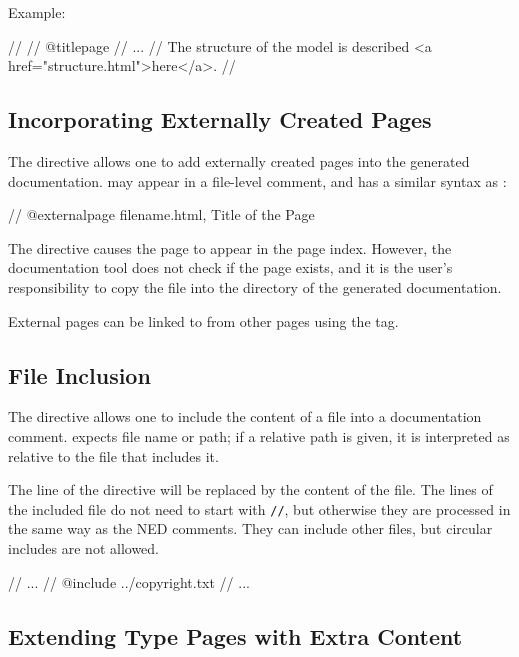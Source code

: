 Example:
\begin{ned}
//
// @titlepage
// ...
// The structure of the model is described <a href="structure.html">here</a>.
//
\end{ned}


\subsection{Incorporating Externally Created Pages}
\label{sec:neddoc:externally-created-pages}

The  directive allows one to add externally created
pages into the generated documentation.  may appear
in a file-level comment, and has a similar syntax as :

\begin{ned}
// @externalpage filename.html, Title of the Page
\end{ned}

The directive causes the page to appear in the page index. However, the
documentation tool does not check if the page exists, and it is the user's
responsibility to copy the file into the directory of the generated
documentation.

External pages can be linked to from other pages using the  tag.


\subsection{File Inclusion}
\label{sec:neddoc:file-inclusion}

The  directive allows one to include the content of a file
into a documentation comment.  expects file name or path; if
a relative path is given, it is interpreted as relative to the file that
includes it.

The line of the  directive will be replaced by the
content of the file. The lines of the included file do not need
to start with \texttt{//}, but otherwise they are processed in the same way
as the NED comments. They can include other files, but circular
includes are not allowed.

\begin{ned}
// ...
// @include ../copyright.txt
// ...
\end{ned}

\subsection{Extending Type Pages with Extra Content}
\label{sec:neddoc:extending-type-pages}

